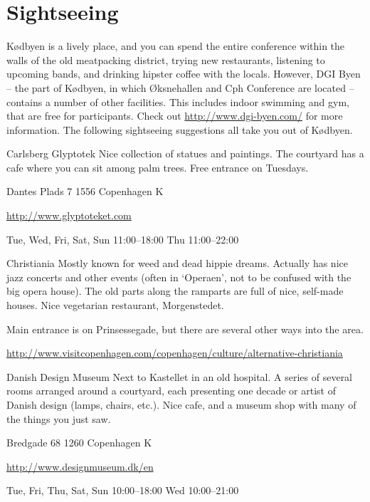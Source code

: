 \section{Sightseeing}
Kødbyen is a lively place, and you can spend the entire conference within the walls of the old meatpacking district, trying new restaurants, listening to upcoming bands, and drinking hipster coffee with the locals. However, DGI Byen – the part of Kødbyen, in which Øksnehallen and Cph Conference are located – contains a number of other facilities. This includes indoor swimming and gym, that are free for participants. Check out \url{http://www.dgi-byen.com/} for more information. The following sightseeing suggestions all take you out of Kødbyen.
\par
\bigskip
\begin{funitem}
{Carlsberg Glyptotek}
{Nice collection of statues and paintings. The courtyard has a cafe where you can sit among palm trees. Free entrance on Tuesdays.}
{\begin{addr}
{Dantes Plads 7}
{1556 Copenhagen K}
\end{addr}}
{\url{http://www.glyptoteket.com}}
{\begin{ohours}
{Tue, Wed, Fri, Sat, Sun}
{11:00–18:00}
{Thu}
{11:00–22:00}
{}
{}
{}
{}
\end{ohours}}
\end{funitem}
\begin{funitemshortaddr}
{Christiania}
{Mostly known for weed and dead hippie dreams. Actually has nice jazz concerts and other events (often in ‘Operaen’, not to be confused with the big opera house). The old parts along the ramparts are full of nice, self-made houses. Nice vegetarian restaurant, Morgenstedet. }
{\begin{shortaddr}
{Main entrance is on Prinsessegade, but there are several other ways into the area.}
\end{shortaddr}}
{\url{http://www.visitcopenhagen.com/copenhagen/culture/alternative-christiania }}
\end{funitemshortaddr}
\begin{funitem}
{Danish Design Museum}
{Next to Kastellet in an old hospital. A series of several rooms arranged around a courtyard, each presenting one decade or artist of Danish design (lamps, chairs, etc.). Nice cafe, and a museum shop with many of the things you just saw.}
{\begin{addr}
{Bredgade 68}
{1260 Copenhagen K}
\end{addr}}
{\url{http://www.designmuseum.dk/en}}
{\begin{ohours}
{Tue, Fri, Thu, Sat, Sun}
{10:00–18:00}
{Wed}
{10:00–21:00}
{}
{}
{}
{}
\end{ohours}}
\end{funitem}
